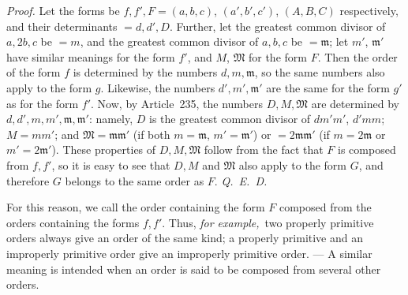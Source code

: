 \textit{Proof.} Let the forms be $f,f',F=(a,b,c)$, $(a',b',c')$, $(A,B,C)$ respectively, and their determinants $=d,d',D$. Further, let the greatest common divisor of $a,2b,c$ be $=m$, and the greatest common divisor of $a,b,c$ be $=\mathfrak{m}$; let $m'$, $\mathfrak{m}'$ have similar meanings for the form $f'$, and $M$, $\mathfrak{M}$ for the form $F$. Then the order of the form $f$ is determined by the numbers $d,m,\mathfrak{m}$, so the same numbers also apply to the form $g$. Likewise, the numbers $d',m',\mathfrak{m}'$ are the same for the form $g'$ as for the form $f'$. Now, by Article~235, the numbers $D,M,\mathfrak{M}$ are determined by $d,d',m,m',\mathfrak{m},\mathfrak{m}'$: namely, $D$ is the greatest common divisor of $dm'm'$, $d'mm$; $M=mm'$; and $\mathfrak{M}=\mathfrak{m}\mathfrak{m}'$ (if both $m=\mathfrak{m}$, $m'=\mathfrak{m}'$) or $=2\mathfrak{m}\mathfrak{m}'$ (if $m=2\mathfrak{m}$ or $m'=2\mathfrak{m}'$). These properties of $D,M,\mathfrak{M}$ follow from the fact that $F$ is composed from $f,f'$, so it is easy to see that $D,M$ and $\mathfrak{M}$ also apply to the form $G$, and therefore $G$ belongs to the same order as $F$. \textit{Q.~E.~D.}

For this reason, we call the order containing the form $F$ composed from the orders containing the forms $f,f'$. Thus, \textit{for example,}\ two properly primitive orders always give an order of the same kind; a properly primitive and an improperly primitive order give an improperly primitive order. --- A similar meaning is intended when an order is said to be composed from several other orders.
